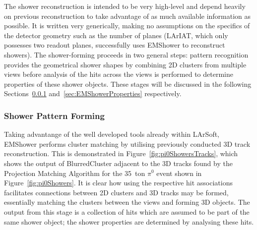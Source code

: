 The shower reconstruction is intended to be very high-level and depend heavily on previous reconstruction to take advantage of as much available information as possible.  It is written very generically, making no assumptions on the specifics of the detector geometry such as the number of planes (LArIAT, which only possesses two readout planes, successfully uses EMShower to reconstruct showers).  The shower-forming proceeds in two general steps: pattern recognition provides the geometrical shower shapes by combining 2D clusters from multiple views before analysis of the hits across the views is performed to determine properties of these shower objects.  These stages will be discussed in the following Sections~\ref{sec:EMShowerPattern} and~\ref{sec:EMShowerProperties} respectively.

\subsubsection{Shower Pattern Forming}\label{sec:EMShowerPattern}

Taking advantange of the well developed tools already within LArSoft, EMShower performs cluster matching by utilising previously conducted 3D track reconstruction.  This is demonstrated in Figure~\ref{fig:pi0ShowersTracks}, which shows the output of BlurredCluster adjacent to the 3D tracks found by the Projection Matching Algorithm for the 35~ton $\pi^0$ event shown in Figure~\ref{fig:pi0Showers}.  It is clear how using the respective hit associations facilitates connections between 2D clusters and 3D tracks may be formed, essentially matching the clusters between the views and forming 3D objects.  The output from this stage is a collection of hits which are assumed to be part of the same shower object; the shower properties are determined by analysing these hits.

